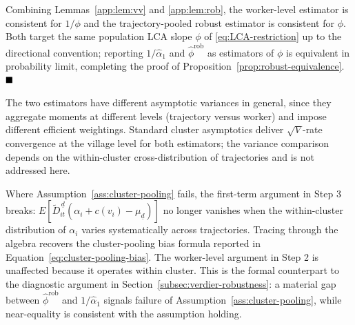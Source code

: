 Combining Lemmas~\ref{app:lem:vv} and \ref{app:lem:rob}, the worker-level estimator is consistent for $1/\phi$ and the trajectory-pooled robust estimator is consistent for $\phi$.
Both target the same population LCA slope $\phi$ of \eqref{eq:LCA-restriction} up to the directional convention; reporting $1/\hat\alpha_1$ and $\hat\phi^{\mathrm{rob}}$ as estimators of $\phi$ is equivalent in probability limit, completing the proof of Proposition~\ref{prop:robust-equivalence}. $\hfill\blacksquare$

The two estimators have different asymptotic variances in general, since they aggregate moments at different levels (trajectory versus worker) and impose different efficient weightings.
Standard cluster asymptotics deliver $\sqrt V$-rate convergence at the village level for both estimators; the variance comparison depends on the within-cluster cross-distribution of trajectories and is not addressed here.

Where Assumption~\ref{ass:cluster-pooling} fails, the first-term argument in Step 3 breaks: $E[\tilde D_{it}^{\,\underline d}(\alpha_i + c(v_i) - \mu_{\underline d})]$ no longer vanishes when the within-cluster distribution of $\alpha_i$ varies systematically across trajectories.
Tracing through the algebra recovers the cluster-pooling bias formula reported in Equation~\eqref{eq:cluster-pooling-bias}.
The worker-level argument in Step 2 is unaffected because it operates within cluster.
This is the formal counterpart to the diagnostic argument in Section~\ref{subsec:verdier-robustness}: a material gap between $\hat\phi^{\mathrm{rob}}$ and $1/\hat\alpha_1$ signals failure of Assumption~\ref{ass:cluster-pooling}, while near-equality is consistent with the assumption holding.
